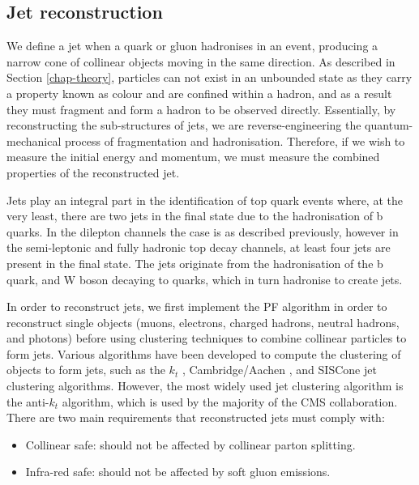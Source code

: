 \subsection{Jet reconstruction} \label{subsec-JetReconstruction}

We define a jet when a quark or gluon hadronises in an event, producing a narrow cone of collinear objects moving in the same direction. As described in Section \ref{chap-theory}, particles can not exist in an unbounded state as they carry a property known as colour and are confined within a hadron, and as a result they must fragment and form a hadron to be observed directly. Essentially, by reconstructing the sub-structures of jets, we are reverse-engineering the quantum-mechanical process of fragmentation and hadronisation. Therefore, if we wish to measure the initial energy and momentum, we must measure the combined properties of the reconstructed jet. 

Jets play an integral part in the identification of top quark events where, at the very least, there are two jets in the final state due to the hadronisation of b quarks. In the dilepton channels the case is as described previously, however in the semi-leptonic and fully hadronic top decay channels, at least four jets are present in the final state. The jets originate from the hadronisation of the b quark, and W boson decaying to quarks, which in turn hadronise to create jets.  

In order to reconstruct jets, we first implement the PF algorithm in order to reconstruct single objects (muons, electrons, charged hadrons, neutral hadrons, and photons) before using clustering techniques to combine collinear particles to form jets. Various algorithms have been developed to compute the clustering of objects to form jets, such as the $k_t$ \cite{Ellis:1993tq}, Cambridge/Aachen \cite{Dokshitzer:1997in}, and SISCone \cite{Blazey:2000qt} jet clustering algorithms. However, the most widely used jet clustering algorithm is the anti-$k_t$ \cite{Cacciari:2008gp} algorithm, which is used by the majority of the CMS collaboration. There are two main requirements that reconstructed jets must comply with:

\begin{itemize}
	\item Collinear safe: should not be affected by collinear parton splitting.
	\item Infra-red safe: should not be affected by soft gluon emissions.
\end{itemize}

